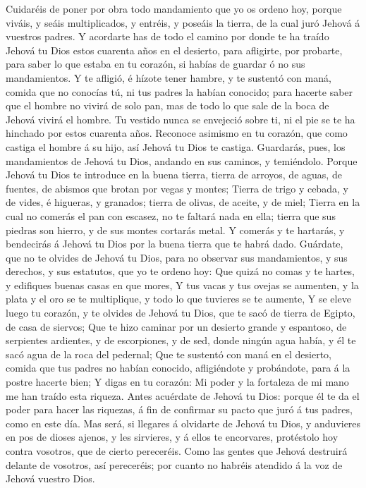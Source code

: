  Cuidaréis de poner por obra todo mandamiento que yo os
ordeno hoy, porque viváis, y seáis multiplicados, y entréis, y poseáis
la tierra, de la cual juró Jehová á vuestros padres.  Y
acordarte has de todo el camino por donde te ha traído Jehová tu Dios
estos cuarenta años en el desierto, para afligirte, por probarte, para
saber lo que estaba en tu corazón, si habías de guardar ó no sus
mandamientos.  Y te afligió, é hízote tener hambre, y te
sustentó con maná, comida que no conocías tú, ni tus padres la habían
conocido; para hacerte saber que el hombre no vivirá de solo pan, mas de
todo lo que sale de la boca de Jehová vivirá el hombre. 
Tu vestido nunca se envejeció sobre ti, ni el pie se te ha hinchado por
estos cuarenta años.  Reconoce asimismo en tu corazón, que
como castiga el hombre á su hijo, así Jehová tu Dios te castiga.
 Guardarás, pues, los mandamientos de Jehová tu Dios,
andando en sus caminos, y temiéndolo.  Porque Jehová tu
Dios te introduce en la buena tierra, tierra de arroyos, de aguas, de
fuentes, de abismos que brotan por vegas y montes;  Tierra
de trigo y cebada, y de vides, é higueras, y granados; tierra de olivas,
de aceite, y de miel;  Tierra en la cual no comerás el pan
con escasez, no te faltará nada en ella; tierra que sus piedras son
hierro, y de sus montes cortarás metal.  Y comerás y te
hartarás, y bendecirás á Jehová tu Dios por la buena tierra que te habrá
dado.  Guárdate, que no te olvides de Jehová tu Dios,
para no observar sus mandamientos, y sus derechos, y sus estatutos, que
yo te ordeno hoy:  Que quizá no comas y te hartes, y
edifiques buenas casas en que mores,  Y tus vacas y tus
ovejas se aumenten, y la plata y el oro se te multiplique, y todo lo que
tuvieres se te aumente,  Y se eleve luego tu corazón, y
te olvides de Jehová tu Dios, que te sacó de tierra de Egipto, de casa
de siervos;  Que te hizo caminar por un desierto grande y
espantoso, de serpientes ardientes, y de escorpiones, y de sed, donde
ningún agua había, y él te sacó agua de la roca del pedernal;
 Que te sustentó con maná en el desierto, comida que tus
padres no habían conocido, afligiéndote y probándote, para á la postre
hacerte bien;  Y digas en tu corazón: Mi poder y la
fortaleza de mi mano me han traído esta riqueza.  Antes
acuérdate de Jehová tu Dios: porque él te da el poder para hacer las
riquezas, á fin de confirmar su pacto que juró á tus padres, como en
este día.  Mas será, si llegares á olvidarte de Jehová tu
Dios, y anduvieres en pos de dioses ajenos, y les sirvieres, y á ellos
te encorvares, protéstolo hoy contra vosotros, que de cierto pereceréis.
 Como las gentes que Jehová destruirá delante de
vosotros, así pereceréis; por cuanto no habréis atendido á la voz de
Jehová vuestro Dios.

